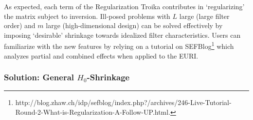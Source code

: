 \documentclass[11pt]{article}
\begin{document}
As expected, each term of the Regularization Troika contributes in `regularizing' the matrix subject to inversion. Ill-posed problems with $L$ large (large filter order) and $m$ large (high-dimensional design) can be solved effectively by imposing `desirable' shrinkage towards idealized filter characteristics. Users can familiarize with the new features by relying on a 
tutorial on SEFBlog\footnote{http://blog.zhaw.ch/idp/sefblog/index.php?/archives/246-Live-Tutorial-Round-2-What-is-Regularization-A-Follow-UP.html.} which analyzes partial and combined effects when applied to the EURI. 

\subsubsection{Solution: General $H_0$-Shrinkage}\label{zeroshrink+}
\end{document}
